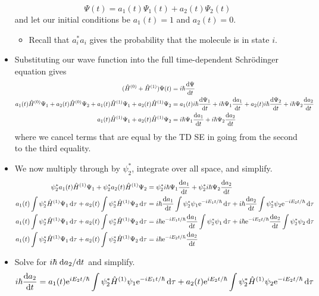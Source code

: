 \documentclass[../notes.tex]{subfiles}
\begin{document}
\begin{itemize}
    \begin{equation*}
        \Psi(t) = a_1(t)\Psi_1(t)+a_2(t)\Psi_2(t)
    \end{equation*}
    and let our initial conditions be $a_1(t)=1$ and $a_2(t)=0$.
    \begin{itemize}
        \item Recall that $a_i^*a_i$ gives the probability that the molecule is in state $i$.
    \end{itemize}
    \item Substituting our wave function into the full time-dependent Schr\"{o}dinger equation gives
    \begin{align*}
        (\hat{H}^{(0)}+\hat{H}^{(1)})\Psi(t) &= i\hbar\dv{\Psi}{t}\\
        a_1(t)\hat{H}^{(0)}\Psi_1+a_2(t)\hat{H}^{(0)}\Psi_2+a_1(t)\hat{H}^{(1)}\Psi_1+a_2(t)\hat{H}^{(1)}\Psi_2 &= a_1(t)i\hbar\dv{\Psi_1}{t}+i\hbar\Psi_1\dv{a_1}{t}+a_2(t)i\hbar\dv{\Psi_2}{t}+i\hbar\Psi_2\dv{a_2}{t}\\
        a_1(t)\hat{H}^{(1)}\Psi_1+a_2(t)\hat{H}^{(1)}\Psi_2 &= i\hbar\Psi_1\dv{a_1}{t}+i\hbar\Psi_2\dv{a_2}{t}
    \end{align*}
    where we cancel terms that are equal by the TD SE in going from the second to the third equality.
    \item We now multiply through by $\psi_2^*$, integrate over all space, and simplify.
    \begin{align*}
        \psi_2^*a_1(t)\hat{H}^{(1)}\Psi_1+\psi_2^*a_2(t)\hat{H}^{(1)}\Psi_2 &= \psi_2^*i\hbar\Psi_1\dv{a_1}{t}+\psi_2^*i\hbar\Psi_2\dv{a_2}{t}\\
        a_1(t)\int\psi_2^*\hat{H}^{(1)}\Psi_1\dd{\tau}+a_2(t)\int\psi_2^*\hat{H}^{(1)}\Psi_2\dd{\tau} &= i\hbar\dv{a_1}{t}\int\psi_2^*\psi_1\e[-iE_1t/\hbar]\dd{\tau}+i\hbar\dv{a_2}{t}\int\psi_2^*\psi_2\e[-iE_2t/\hbar]\dd{\tau}\\
        a_1(t)\int\psi_2^*\hat{H}^{(1)}\Psi_1\dd{\tau}+a_2(t)\int\psi_2^*\hat{H}^{(1)}\Psi_2\dd{\tau} &= i\hbar\e[-iE_1t/\hbar]\dv{a_1}{t}\int\psi_2^*\psi_1\dd{\tau}+i\hbar\e[-iE_2t/\hbar]\dv{a_2}{t}\int\psi_2^*\psi_2\dd{\tau}\\
        a_1(t)\int\psi_2^*\hat{H}^{(1)}\Psi_1\dd{\tau}+a_2(t)\int\psi_2^*\hat{H}^{(1)}\Psi_2\dd{\tau} &= i\hbar\e[-iE_2t/\hbar]\dv{a_2}{t}
    \end{align*}
    \item Solve for $i\hbar\dv*{a_2}{t}$ and simplify.
    \begin{align*}
        i\hbar\dv{a_2}{t} &= a_1(t)\e[iE_2t/\hbar]\int\psi_2^*\hat{H}^{(1)}\psi_1\e[-iE_1t/\hbar]\dd{\tau}+a_2(t)\e[iE_2t/\hbar]\int\psi_2^*\hat{H}^{(1)}\psi_2\e[-iE_2t/\hbar]\dd{\tau}\\

\end{align*}
\end{itemize}
\end{document}
